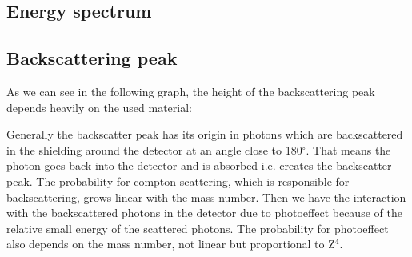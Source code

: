 \documentclass[bigchapter,colorback,accentcolor=tud4b,linedtoc,11pt]{tudreport}
\begin{document}
\subsection{Energy spectrum}

\subsection{Backscattering peak}

As we can see in the following graph, the height of the backscattering peak depends heavily on the used material: 

\begin{center}
\begin{figure}[H]
\end{figure}
\end{center}

Generally the backscatter peak has its origin in photons which are backscattered in the shielding around the detector at an angle close to 180$^{\circ}$. That means the photon goes back into the detector and is absorbed i.e. creates the backscatter peak. The probability for compton scattering, which is responsible for backscattering, grows linear with the mass number. Then we have the interaction with the backscattered photons in the detector due to photoeffect because of the relative small energy of the scattered photons. The probability for photoeffect also depends on the mass number, not linear but proportional to Z$^4$. 
\end{document}
